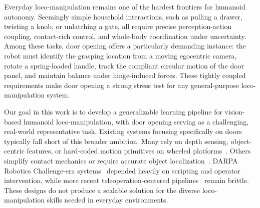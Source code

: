 

Everyday loco-manipulation remains one of the hardest frontiers for humanoid autonomy. Seemingly simple household interactions, such as pulling a drawer, twisting a knob, or unlatching a gate, all require precise perception-action coupling, contact-rich control, and whole-body coordination under uncertainty. Among these tasks, door opening offers a particularly demanding instance: the robot must identify the grasping location from a moving egocentric camera, rotate a spring-loaded handle, track the compliant circular motion of the door panel, and maintain balance under hinge-induced forces. These tightly coupled requirements make door opening a strong stress test for any general-purpose loco-manipulation system.

Our goal in this work is to develop a generalizable learning pipeline for vision-based humanoid loco-manipulation, with door opening serving as a challenging, real-world representative task. Existing systems focusing specifically on doors typically fall short of this broader ambition. Many rely on depth sensing, object-centric features, or hard-coded motion primitives on wheeled platforms~\citep{calvert2025behavior, xiong2024adaptive, weng2025hdmi}. Others simplify contact mechanics or require accurate object localization~\citep{traverse-doors-2025}. DARPA Robotics Challenge-era systems~\citep{oh2017technical} depended heavily on scripting and operator intervention, while more recent teleoperation-centered pipelines~\citep{lee2025stageact} remain brittle. These designs do not produce a scalable solution for the diverse loco-manipulation skills needed in everyday environments.

